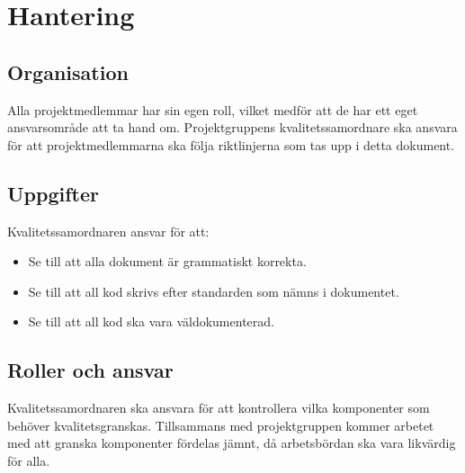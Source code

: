 \section{Hantering}

\subsection{Organisation}
Alla projektmedlemmar har sin egen roll, vilket medför att de har ett eget ansvarsområde att ta hand om. Projektgruppens kvalitetssamordnare ska ansvara för att projektmedlemmarna ska följa riktlinjerna som tas upp i detta dokument.

\subsection{Uppgifter}
Kvalitetssamordnaren ansvar för att:
\begin{itemize}
\item Se till att alla dokument är grammatiskt korrekta. 
\item Se till att all kod skrivs efter standarden som nämns i dokumentet.
\item Se till att all kod ska vara väldokumenterad.
\end{itemize}

\subsection{Roller och ansvar}
Kvalitetssamordnaren ska ansvara för att kontrollera vilka komponenter som behöver kvalitetsgranskas. Tillsammans med projektgruppen kommer arbetet med att granska komponenter fördelas jämnt, då arbetsbördan ska vara likvärdig för alla.




